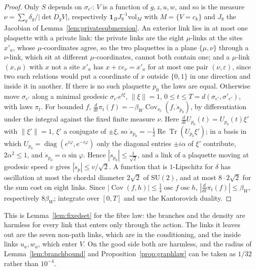 \documentclass[11pt]{amsart}
\theoremstyle{definition}
\theoremstyle{remark}
\numberwithin{equation}{section}
\newcommand{\SU}{\mathrm{SU}}
\newcommand{\ReTr}{\operatorname{Re}\operatorname{Tr}}
\newcommand{\Cov}{\operatorname{Cov}}
\begin{document}
\begin{proof}
Only $S$ depends on $\sigma_{e'}$: $V$ is a function of $g,z,u,w$, and so
is the measure $\nu=\sum_g\delta_g/\lvert\det D_gV\rvert$, respectively
$\mathbf1_BJ_8^{-1}\mathrm{vol}_M$ with $M=\{V=c_k\}$ and $J_8$ the
Jacobian of Lemma~\ref{lem:privatesubmersion}. An exterior link lies in at
most one plaquette with a private link: the private links are the eight
$\mu$-links at the sites $x'_a$, whose $\mu$-coordinates agree, so the two
plaquettes in a plane $\{\mu,\nu\}$ through a $\nu$-link, which sit at
different $\mu$-coordinates, cannot both contain one; and a $\mu$-link
$(x,\mu)$ with $x$ not a site $x'_a$ has $x+\varepsilon e_\nu=x'_a$ for at
most one pair $(\nu,\varepsilon)$, since two such relations would put a
coordinate of $x$ outside $\{0,1\}$ in one direction and inside it in
another. If there is no such plaquette $p_0$ the laws are equal. Otherwise
move $\sigma_{e'}$ along a minimal geodesic $\sigma_{e'}e^{t\xi}$,
$\lVert\xi\rVert=1$, $0\le t\le T=d(\sigma_{e'},\sigma'_{e'})$, with laws
$\pi_t$. For bounded $f$, $\frac d{dt}\pi_t(f)=-\beta_W\Cov_{\pi_t}(f,\dot
s_{p_0})$, by differentiation under the integral against the fixed finite
measure $\nu$. Here $\frac d{dt}U_{p_0}(t)=U_{p_0}(t)\xi'$ with
$\lVert\xi'\rVert=1$, $\xi'$ a conjugate of $\pm\xi$, so $\dot s_{p_0}=
-\frac12\ReTr(U_{p_0}\xi')$; in a basis in which $U_{p_0}=\operatorname{diag}
(e^{i\varphi},e^{-i\varphi})$ only the diagonal entries $\pm i\alpha$ of
$\xi'$ contribute, $2\alpha^2\le1$, and $\dot s_{p_0}=\alpha\sin\varphi$.
Hence $|\dot s_{p_0}|\le\frac1{\sqrt2}$, and a link of a plaquette moving
at geodesic speed $v$ gives $|\dot s_p|\le v/\sqrt2$. A function that is
$1$-Lipschitz for $\delta$ has oscillation at most the chordal diameter
$2\sqrt2$ of $\SU(2)$, and at most $8\cdot2\sqrt2$ for the sum cost on
eight links. Since $|\Cov(f,h)|\le\frac14\operatorname{osc}f
\operatorname{osc}h$, $|\frac d{dt}\pi_t(f)|\le\beta_W$, respectively
$8\beta_W$; integrate over $[0,T]$ and use the Kantorovich duality.
\end{proof}

This is Lemma~\ref{lem:fixedset} for the fibre law: the branches and the
density are harmless for every link that enters only through the action.
The links it leaves out are the seven non-path links, which are in the
conditioning, and the inside links $u_a,w_a$, which enter $V$. On the good
side both are harmless, and the radius of Lemma~\ref{lem:branchbound} and
Proposition~\ref{prop:graphlaw} can be taken as $1/32$ rather than
$10^{-4}$.
\end{document}
